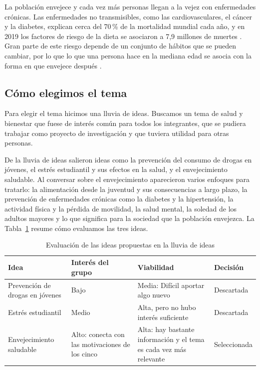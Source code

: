 \documentclass[12pt, letterpaper, table, xcdraw]{extarticle}
\renewcommand{\arraystretch}{2}
\newcommand{\leyendaFont}[1]{\fontsize{10}{12}\selectfont #1}
\begin{document}
La población envejece y cada vez más personas llegan a la vejez con enfermedades crónicas. Las enfermedades no transmisibles, como las cardiovasculares, el cáncer y la diabetes, explican cerca del 70\,\% de la mortalidad mundial cada año, y en 2019 los factores de riesgo de la dieta se asociaron a 7,9 millones de muertes \parencite{dominguez2022}. Gran parte de este riesgo depende de un conjunto de hábitos que se pueden cambiar, por lo que lo que una persona hace en la mediana edad se asocia con la forma en que envejece después \parencite{bosnes2019}.

{}
\subsection*{Cómo elegimos el tema}

Para elegir el tema hicimos una lluvia de ideas. Buscamos un tema de salud y bienestar que fuese de interés común para todos los integrantes, que se pudiera trabajar como proyecto de investigación y que tuviera utilidad para otras personas. 

De la lluvia de ideas salieron ideas como la prevención del consumo de drogas en jóvenes, el estrés estudiantil y sus efectos en la salud, y el envejecimiento saludable. Al conversar sobre el envejecimiento aparecieron varios enfoques para tratarlo: la alimentación desde la juventud y sus consecuencias a largo plazo, la prevención de enfermedades crónicas como la diabetes y la hipertensión, la actividad física y la pérdida de movilidad, la salud mental, la soledad de los adultos mayores y lo que significa para la sociedad que la población envejezca. La Tabla~\ref{tab:viabilidad} resume cómo evaluamos las tres ideas.

\begin{table}[!htbp]
    \centering
    \caption{\leyendaFont{Evaluación de las ideas propuestas en la lluvia de ideas}}
    \label{tab:viabilidad}
    {\small
    \renewcommand{\arraystretch}{1.4}
    \begin{tabularx}{\textwidth}{|>{\raggedright\arraybackslash}p{3cm}|>{\raggedright\arraybackslash}X|>{\raggedright\arraybackslash}X|>{\centering\arraybackslash}p{2.2cm}|}
        \hline
        \textbf{Idea} & \textbf{Interés del grupo} & \textbf{Viabilidad} & \textbf{Decisión} \\ \hline
        Prevención de drogas en jóvenes & Bajo & Media: Difícil aportar algo nuevo & Descartada \\ \hline
        Estrés estudiantil & Medio & Alta, pero no hubo interés suficiente & Descartada \\ \hline
        Envejecimiento saludable & Alto: conecta con las motivaciones de los cinco & Alta: hay bastante información y el tema es cada vez más relevante & Seleccionada \\ \hline
    \end{tabularx}
    }
\end{table}
\end{document}
